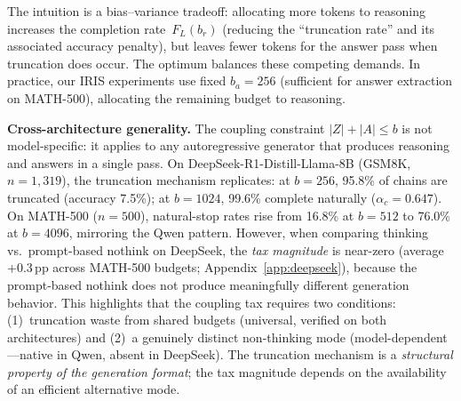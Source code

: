 \noindent
The intuition is a bias--variance tradeoff: allocating more tokens to
reasoning increases the completion rate~$F_L(b_r)$ (reducing the
``truncation rate'' and its associated accuracy penalty), but leaves fewer
tokens for the answer pass when truncation does occur.
The optimum balances these competing demands.
In practice, our IRIS experiments use fixed $b_a = 256$ (sufficient for
answer extraction on MATH-500), allocating the remaining budget to reasoning.

\noindent
\textbf{Cross-architecture generality.}
The coupling constraint $|Z|+|A| \le b$ is not model-specific: it
applies to any autoregressive generator that produces reasoning and
answers in a single pass.
On DeepSeek-R1-Distill-Llama-8B (GSM8K, $n{=}1{,}319$), the truncation
mechanism replicates: at $b{=}256$, 95.8\% of chains are truncated (accuracy 7.5\%);
at $b{=}1024$, 99.6\% complete naturally ($\alpha_c = 0.647$).
On MATH-500 ($n{=}500$), natural-stop rates rise from 16.8\% at $b{=}512$
to 76.0\% at $b{=}4096$, mirroring the Qwen pattern.
However, when comparing thinking vs.\ prompt-based nothink on DeepSeek,
the \emph{tax magnitude} is near-zero (average +0.3\,pp across MATH-500 budgets;
Appendix~\ref{app:deepseek}), because the prompt-based nothink does not
produce meaningfully different generation behavior.
This highlights that the coupling tax requires two conditions:
(1)~truncation waste from shared budgets (universal, verified on both
architectures) and (2)~a genuinely distinct non-thinking mode
(model-dependent---native in Qwen, absent in DeepSeek).
The truncation mechanism is a \emph{structural property of the generation format};
the tax magnitude depends on the availability of an efficient alternative mode.
